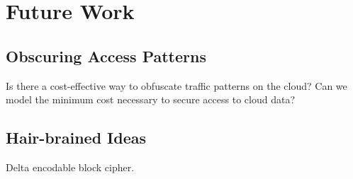 \section{Future Work}

\subsection{Obscuring Access Patterns}

Is there a cost-effective way to obfuscate traffic patterns on the
cloud? Can we model the minimum cost necessary to secure access to
cloud data?

\subsection{Hair-brained Ideas}

Delta encodable block cipher.
